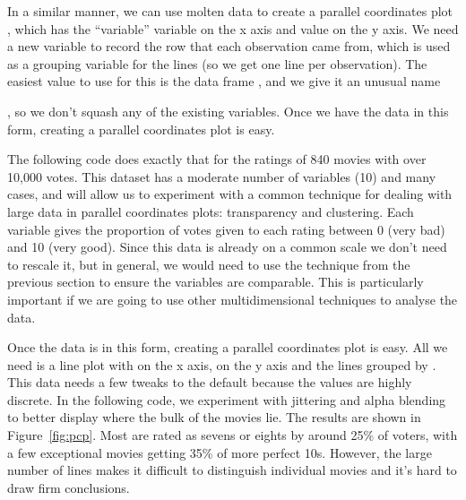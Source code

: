 In a similar manner, we can use molten data to create a parallel coordinates plot \citep{inselberg:1985,wegman:1990}, which has the ``variable'' variable on the x axis and value on the y axis.  We need a new variable to record the row that each observation came from, which is used as a grouping variable for the lines (so we get one line per observation). The easiest value to use for this is the data frame , and we give it an unusual name {, so we don't squash any of the existing variables. Once we have the data in this form, creating a parallel coordinates plot is easy. 

The following code does exactly that for the ratings of 840 movies with over 10,000 votes. This dataset has a moderate number of variables (10) and many cases, and will allow us to experiment with a common technique for dealing with large data in parallel coordinates plots: transparency and clustering. Each variable gives the proportion of votes given to each rating between 0 (very bad) and 10 (very good). Since this data is already on a common scale we don't need to rescale it, but in general, we would need to use the technique from the previous section to ensure the variables are comparable. This is particularly important if we are going to use other multidimensional techniques to analyse the data. 

% 


Once the data is in this form, creating a parallel coordinates plot is easy. All we need is a line plot with  on the x axis,  on the y axis and the lines grouped by . This data needs a few tweaks to the default because the values are highly discrete. In the following code, we experiment with jittering and alpha blending to better display where the bulk of the movies lie. The results are shown in Figure~\ref{fig:pcp}. Most are rated as sevens or eights by around 25\% of voters, with a few exceptional movies getting 35\% of more perfect 10s. However, the large number of lines makes it difficult to distinguish individual movies and it's hard to draw firm conclusions. 

%


}
